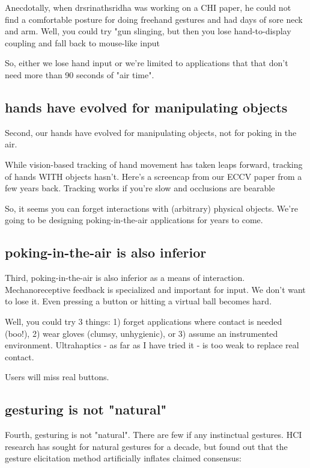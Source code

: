 Anecdotally, when drsrinathsridha was working on a CHI paper, he could not find a comfortable posture for doing freehand gestures and had days of sore neck and arm. Well, you could try "gun slinging, but then you lose hand-to-display coupling and fall back to mouse-like input

So, either we lose hand input or we're limited to applications that that don't need more than 90 seconds of "air time". 




\subsection{hands have evolved for manipulating objects}
Second, our hands have evolved for manipulating objects, not for poking in the air. 


While vision-based tracking of hand movement has taken leaps forward, tracking of hands WITH objects hasn't. Here's a screencap from our ECCV paper from a few years back. Tracking works if you're slow and occlusions are bearable


So, it seems you can forget interactions with (arbitrary) physical objects. We're going to be designing poking-in-the-air applications for years to come. 

\subsection{poking-in-the-air is also inferior}
Third, poking-in-the-air is also inferior as a means of interaction. Mechanoreceptive feedback is specialized and important for input. We don't want to lose it. Even pressing a button or hitting a virtual ball becomes hard. 

Well, you could try 3 things: 1) forget applications where contact is needed (boo!), 2) wear gloves (clumsy, unhygienic), or 3) assume an instrumented environment. Ultrahaptics - as far as I have tried it - is too weak to replace real contact. 

Users will miss real buttons. 


\subsection{gesturing is not "natural"}
Fourth, gesturing is not "natural". There are few if any instinctual gestures. HCI research has sought for natural gestures for a decade, but found out that the gesture elicitation method artificially inflates claimed consensus: 

